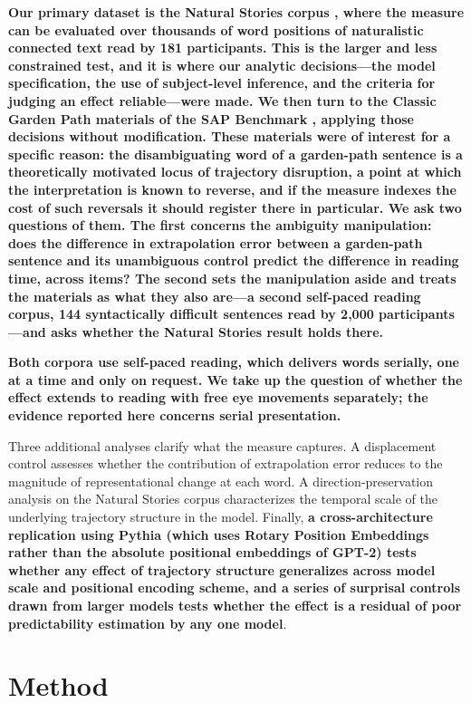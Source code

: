 \documentclass[12pt]{article}
\newcommand{\new}[1]{{\bfseries #1}}
\begin{document}
\new{Our primary dataset is the Natural Stories corpus \citep{futrell2018}, where the measure can be evaluated over thousands of word positions of naturalistic connected text read by 181 participants. This is the larger and less constrained test, and it is where our analytic decisions---the model specification, the use of subject-level inference, and the criteria for judging an effect reliable---were made. We then turn to the Classic Garden Path materials of the SAP Benchmark \citep{huang2024}, applying those decisions without modification. These materials were of interest for a specific reason: the disambiguating word of a garden-path sentence is a theoretically motivated locus of trajectory disruption, a point at which the interpretation is known to reverse, and if the measure indexes the cost of such reversals it should register there in particular. We ask two questions of them. The first concerns the ambiguity manipulation: does the difference in extrapolation error between a garden-path sentence and its unambiguous control predict the difference in reading time, across items? The second sets the manipulation aside and treats the materials as what they also are---a second self-paced reading corpus, 144 syntactically difficult sentences read by 2,000 participants---and asks whether the Natural Stories result holds there.}

\new{Both corpora use self-paced reading, which delivers words serially, one at a time and only on request. We take up the question of whether the effect extends to reading with free eye movements separately; the evidence reported here concerns serial presentation.}

Three additional analyses clarify what the measure captures. A displacement control assesses whether the contribution of extrapolation error reduces to the magnitude of representational change at each word. A direction-preservation analysis on the Natural Stories corpus characterizes the temporal scale of the underlying trajectory structure in the model. Finally, \new{a cross-architecture replication using Pythia (which uses Rotary Position Embeddings rather than the absolute positional embeddings of GPT-2) tests whether any effect of trajectory structure generalizes across model scale and positional encoding scheme, and a series of surprisal controls drawn from larger models tests whether the effect is a residual of poor predictability estimation by any one model}.

\section{Method}
\end{document}
